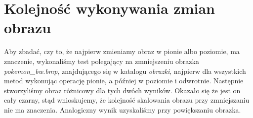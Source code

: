 \section{Kolejność wykonywania zmian obrazu}
Aby zbadać, czy to, że najpierw zmieniamy obraz w pionie albo poziomie, ma znaczenie,
wykonaliśmy test polegający na zmniejszeniu obrazka \textit{pokemon\_bw.bmp},
znajdującego się w katalogu \textit{obrazki}, najpierw dla wszystkich metod wykonując operację pionie,
a później w poziomie i odwrotnie. Następnie stworzyliśmy obraz różnicowy dla
tych dwóch wyników. Okazało się że jest on cały czarny, stąd wnioskujemy, że
kolejność skalowania obrazu przy zmniejszaniu nie ma znaczenia. Analogiczny wynik
uzyskaliśmy przy powiększaniu obrazka.
